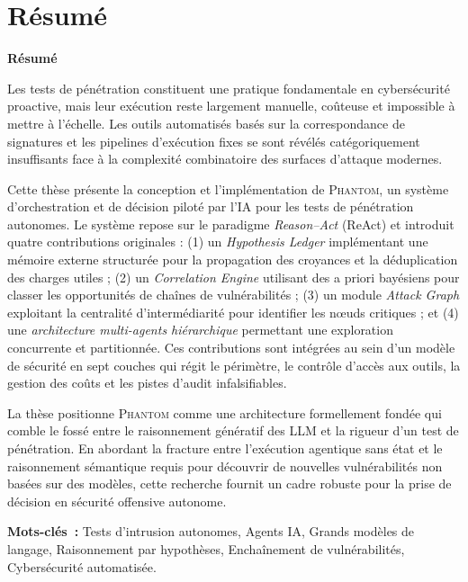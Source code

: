 \documentclass[12pt,a4paper,oneside,openany]{book}
\newcommand{\Phantom}{\textsc{Phantom}}
\begin{document}
\chapter*{Résumé}
\vspace{0.5cm}
\begin{center}
{\large\bfseries Résumé}
\end{center}
\vspace{0.3cm}

Les tests de pénétration constituent une pratique fondamentale en cybersécurité proactive, mais leur exécution reste largement manuelle, coûteuse et impossible à mettre à l'échelle. Les outils automatisés basés sur la correspondance de signatures et les pipelines d'exécution fixes se sont révélés catégoriquement insuffisants face à la complexité combinatoire des surfaces d'attaque modernes.

Cette thèse présente la conception et l'implémentation de \Phantom{}, un système d'orchestration et de décision piloté par l'IA pour les tests de pénétration autonomes. Le système repose sur le paradigme \textit{Reason–Act} (ReAct) et introduit quatre contributions originales : (1) un \textit{Hypothesis Ledger} implémentant une mémoire externe structurée pour la propagation des croyances et la déduplication des charges utiles ; (2) un \textit{Correlation Engine} utilisant des a priori bayésiens pour classer les opportunités de chaînes de vulnérabilités ; (3) un module \textit{Attack Graph} exploitant la centralité d'intermédiarité pour identifier les nœuds critiques ; et (4) une \textit{architecture multi-agents hiérarchique} permettant une exploration concurrente et partitionnée. Ces contributions sont intégrées au sein d'un modèle de sécurité en sept couches qui régit le périmètre, le contrôle d'accès aux outils, la gestion des coûts et les pistes d'audit infalsifiables.

La thèse positionne \Phantom{} comme une architecture formellement fondée qui comble le fossé entre le raisonnement génératif des LLM et la rigueur d'un test de pénétration. En abordant la fracture entre l'exécution agentique sans état et le raisonnement sémantique requis pour découvrir de nouvelles vulnérabilités non basées sur des modèles, cette recherche fournit un cadre robuste pour la prise de décision en sécurité offensive autonome.

\vfill
\noindent\textbf{Mots-clés~:} Tests d'intrusion autonomes, Agents IA, Grands modèles de langage, Raisonnement par hypothèses, Enchaînement de vulnérabilités, Cybersécurité automatisée.
\end{document}
